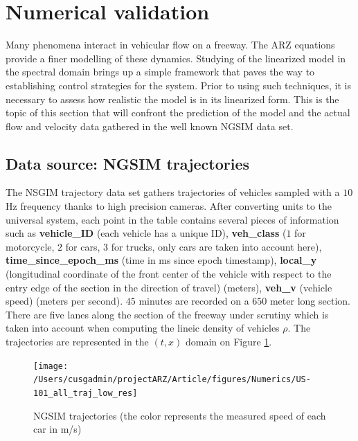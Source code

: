 \documentclass[preprint]{elsarticle}
\begin{document}
\section{Numerical validation}

Many phenomena interact in vehicular flow on a freeway. The ARZ equations
provide a finer modelling of these dynamics. Studying of the linearized
model in the spectral domain brings up a simple framework that paves
the way to establishing control strategies for the system. Prior to
using such techniques, it is necessary to assess how realistic the
model is in its linearized form. This is the topic of this section
that will confront the prediction of the model and the actual flow
and velocity data gathered in the well known NGSIM data set.


\subsection{Data source: NGSIM trajectories}

The NSGIM trajectory data set gathers trajectories of vehicles sampled
with a $10$ Hz frequency thanks to high precision cameras. After
converting units to the universal system, each point in the table
contains several pieces of information such as \textbf{vehicle\_ID}
(each vehicle has a unique ID), \textbf{veh\_class }($1$ for motorcycle,
$2$ for cars, $3$ for trucks, only cars are taken into account here),
\textbf{time\_since\_epoch\_ms} (time in ms since epoch timestamp),
\textbf{local\_y} (longitudinal coordinate of the front center of
the vehicle with respect to the entry edge of the section in the direction
of travel) (meters), \textbf{veh\_v} (vehicle speed) (meters per second).
$45$ minutes are recorded on a $650$ meter long section. There are
five lanes along the section of the freeway under scrutiny which is
taken into account when computing the lineic density of vehicles $\rho$\@.
The trajectories are represented in the $\left(t,x\right)$ domain
on Figure \ref{fig:NGSIM-trajectories}.

\begin{figure}
\begin{centering}
\texttt{[image: /Users/cusgadmin/projectARZ/Article/figures/Numerics/US-101\_all\_traj\_low\_res]}
\par\end{centering}

\protect\caption{NGSIM trajectories (the color represents the measured speed of each
car in m/s)\label{fig:NGSIM-trajectories}}
\end{figure}
\end{document}
